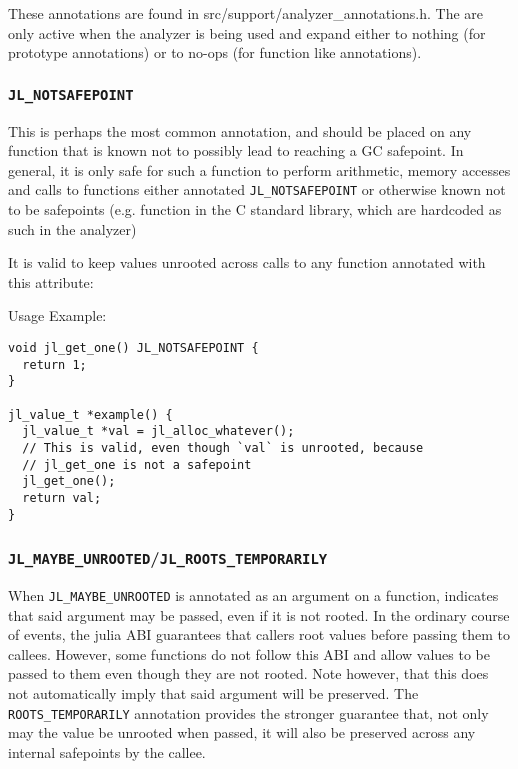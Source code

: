 These annotations are found in src/support/analyzer\_annotations.h. The are only active when the analyzer is being used and expand either to nothing (for prototype annotations) or to no-ops (for function like annotations).



\hypertarget{4716575215472782777}{}


\subsubsection{\texttt{JL\_NOTSAFEPOINT}}



This is perhaps the most common annotation, and should be placed on any function that is known not to possibly lead to reaching a GC safepoint. In general, it is only safe for such a function to perform arithmetic, memory accesses and calls to functions either annotated \texttt{JL\_NOTSAFEPOINT} or otherwise known not to be safepoints (e.g. function in the C standard library, which are hardcoded as such in the analyzer)



It is valid to keep values unrooted across calls to any function annotated with this attribute:



Usage Example:




\begin{lstlisting}
void jl_get_one() JL_NOTSAFEPOINT {
  return 1;
}

jl_value_t *example() {
  jl_value_t *val = jl_alloc_whatever();
  // This is valid, even though `val` is unrooted, because
  // jl_get_one is not a safepoint
  jl_get_one();
  return val;
}
\end{lstlisting}



\hypertarget{2060328680206426649}{}


\subsubsection{\texttt{JL\_MAYBE\_UNROOTED}/\texttt{JL\_ROOTS\_TEMPORARILY}}



When \texttt{JL\_MAYBE\_UNROOTED} is annotated as an argument on a function, indicates that said argument may be passed, even if it is not rooted. In the ordinary course of events, the julia ABI guarantees that callers root values before passing them to callees. However, some functions do not follow this ABI and allow values to be passed to them even though they are not rooted. Note however, that this does not automatically imply that said argument will be preserved. The \texttt{ROOTS\_TEMPORARILY} annotation provides the stronger guarantee that, not only may the value be unrooted when passed, it will also be preserved across any internal safepoints by the callee.



